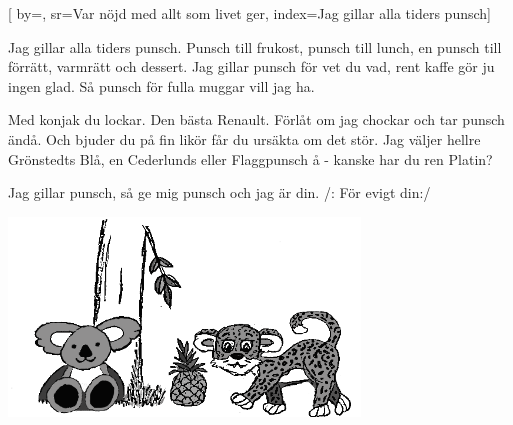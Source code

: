 

[ 		%
	by={},					%
	sr={Var nöjd med allt som livet ger},					%
	index={Jag gillar alla tiders punsch}]						%



\beginverse*						%
Jag gillar alla tiders punsch.
Punsch till frukost, punsch till lunch,
en punsch till förrätt, varmrätt och dessert.
Jag gillar punsch för vet du vad,
rent kaffe gör ju ingen glad.
Så punsch för fulla muggar vill jag ha.
\endverse							%

\beginverse*						%
Med konjak du lockar.
Den bästa Renault.
Förlåt om jag chockar
och tar punsch ändå.
Och bjuder du på fin likör
får du ursäkta om det stör.
Jag väljer hellre Grönstedts Blå,
en Cederlunds eller Flaggpunsch å
- kanske har du ren Platin?
\endverse							%

\beginverse*						%
Jag gillar punsch,
så ge mig punsch och jag är din.
/: För evigt din:/
\endverse							%

\endsong							%

\begin{intersong}
	\begin{center}
		\includegraphics[width=0.7\textwidth]{../bilder/fardigabilder/CamillasFardigaBilder/Djungelboken2.png} 
	\end{center}
\end{intersong}
